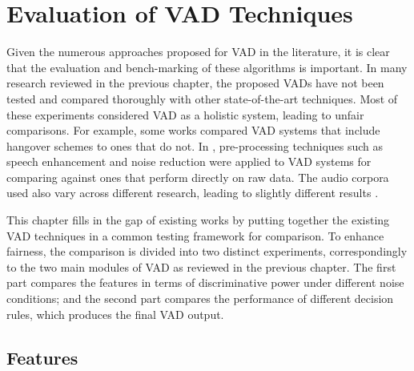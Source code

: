 \chapter{Evaluation of VAD Techniques}
\label{chp:comparison}

Given the numerous approaches proposed for VAD in the literature, it is clear that the evaluation and bench-marking of these algorithms is important.
In many research reviewed in the previous chapter, the proposed VADs have not been tested and compared thoroughly with other state-of-the-art techniques.
Most of these experiments considered VAD as a holistic system, leading to unfair comparisons. For example, some works \cite{} compared VAD systems that include hangover schemes to ones that do not. In \cite{}, pre-processing techniques such as speech enhancement and noise reduction were applied to VAD systems for comparing against ones that perform directly on raw data. The audio corpora used also vary across different research, leading to slightly different results \cite{}.

This chapter fills in the gap of existing works by putting together the existing VAD techniques in a common testing framework for comparison. To enhance fairness, the comparison is divided into two distinct experiments, correspondingly to the two main modules of VAD as reviewed in the previous chapter. The first part compares the features in terms of discriminative power under different noise conditions; and the second part compares the performance of different decision rules, which produces the final VAD output.

\section{Features}


